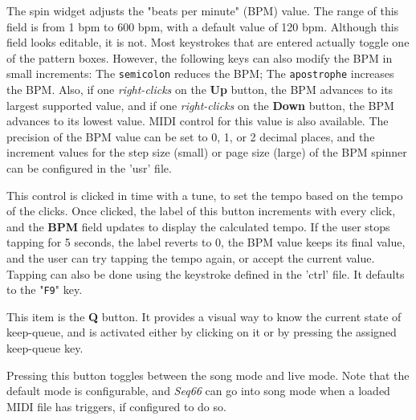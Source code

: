 
   The spin widget adjusts the "beats per minute" (BPM) value.  The
   range of this field is from 1 bpm to 600 bpm, with a default value of
   120 bpm.
   Although this field looks editable, it is not.  Most keystrokes
   that are entered actually toggle one of the pattern boxes.
   However, the following keys can also modify the BPM in small increments:
   The \texttt{semicolon} reduces the BPM;
   The \texttt{apostrophe} increases the BPM.
   Also, if one \textsl{right-clicks} on the
   \textbf{Up} button, the BPM advances to its largest
   supported value, and if one \textsl{right-clicks} on the
   \textbf{Down} button, the BPM
   advances to its lowest value.
   MIDI control for this value is also available.
   The precision of the BPM value can be set to 0, 1, or 2
   decimal places, and the increment values for the step size (small)
   or page size (large) of the BPM spinner can be configured in the 'usr' file.

   This control is clicked in time with a tune, to set the
   tempo based on the tempo of the clicks.  Once clicked, the label of this
   button increments with every click, and the \textbf{BPM} field updates to
   display the calculated tempo.  If the user stops tapping for 5 seconds, the
   label reverts to 0, the BPM value keeps its final value, and the user can
   try tapping the tempo again, or accept the current value.
   Tapping can also be done using the keystroke defined
   in the 'ctrl' file.
   It defaults to the "\texttt{F9}" key.

   This item is the \textbf{Q} button.
   It provides a visual way to know the current state of keep-queue, and is
   activated either by clicking on it or by pressing the assigned keep-queue
   key.

   Pressing this button toggles between the song mode and live mode.
   Note that the default mode is configurable, and \textsl{Seq66} can go into
   song mode when a loaded MIDI file has triggers, if configured to do so.

